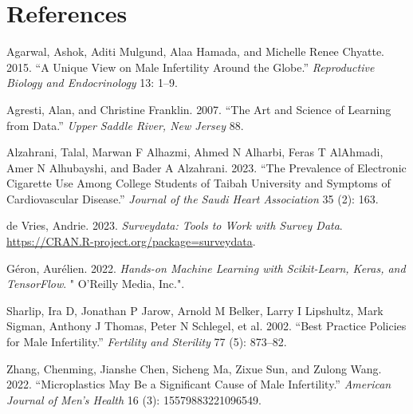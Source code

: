 \documentclass[
]{article}
\newlength{\cslhangindent}
\newenvironment{CSLReferences}[2] %
 {\begin{list}{}{%
  \setlength{\itemindent}{0pt}
  \setlength{\leftmargin}{0pt}
  \setlength{\parsep}{0pt}
  \ifodd #1
   \setlength{\leftmargin}{\cslhangindent}
   \setlength{\itemindent}{-1\cslhangindent}
  \fi
  \setlength{\itemsep}{#2\baselineskip}}}
 {\end{list}}
\begin{document}
\newpage

\section*{References}\label{references}

\label{refs}
\begin{CSLReferences}{1}{0}
Agarwal, Ashok, Aditi Mulgund, Alaa Hamada, and Michelle Renee Chyatte.
2015. {``A Unique View on Male Infertility Around the Globe.''}
\emph{Reproductive Biology and Endocrinology} 13: 1--9.

Agresti, Alan, and Christine Franklin. 2007. {``The Art and Science of
Learning from Data.''} \emph{Upper Saddle River, New Jersey} 88.

Alzahrani, Talal, Marwan F Alhazmi, Ahmed N Alharbi, Feras T AlAhmadi,
Amer N Alhubayshi, and Bader A Alzahrani. 2023. {``The Prevalence of
Electronic Cigarette Use Among College Students of Taibah University and
Symptoms of Cardiovascular Disease.''} \emph{Journal of the Saudi Heart
Association} 35 (2): 163.

de Vries, Andrie. 2023. \emph{Surveydata: Tools to Work with Survey
Data}. \url{https://CRAN.R-project.org/package=surveydata}.

Géron, Aurélien. 2022. \emph{Hands-on Machine Learning with
Scikit-Learn, Keras, and TensorFlow}. " O'Reilly Media, Inc.".

Sharlip, Ira D, Jonathan P Jarow, Arnold M Belker, Larry I Lipshultz,
Mark Sigman, Anthony J Thomas, Peter N Schlegel, et al. 2002. {``Best
Practice Policies for Male Infertility.''} \emph{Fertility and
Sterility} 77 (5): 873--82.

Zhang, Chenming, Jianshe Chen, Sicheng Ma, Zixue Sun, and Zulong Wang.
2022. {``Microplastics May Be a Significant Cause of Male
Infertility.''} \emph{American Journal of Men's Health} 16 (3):
15579883221096549.

\end{CSLReferences}
\end{document}
